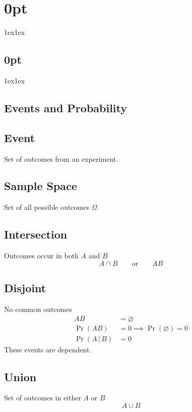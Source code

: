 \documentclass{article}
\begin{document}
\titlespacing*\section{0pt}{1ex}{1ex}
\titlespacing*\subsection{0pt}{1ex}{1ex}
%
\setlength\abovecaptionskip{-5pt}
\setlength\textfloatsep{0pt}
%
\setlength\abovedisplayskip{1pt}
\setlength\belowdisplayskip{1pt}

\begin{multicols}{3}
    \section{Events and Probability}
    \subsection{Event}
    Set of outcomes from an experiment.
    \subsection{Sample Space}
    Set of all possible outcomes \(\Omega\).
    \subsection{Intersection}
    Outcomes occur in both \(A\) and \(B\)
    \begin{equation*}
        A \cap B \quad\quad \text{or} \quad\quad AB
    \end{equation*}
    \subsection{Disjoint}
    No common outcomes
    \begin{align*}
        AB                                & = \varnothing                                    \\
        \Pr{\left( AB \right)}            & = 0 \implies \Pr{\left( \varnothing \right)} = 0 \\
        \Pr{\left( A \,\vert\, B \right)} & = 0
    \end{align*}
    These events are dependent.
    \subsection{Union}
    Set of outcomes in either \(A\) or \(B\)
    \begin{equation*}
        A \cup B
    \end{equation*}

\end{multicols}
\end{document}
